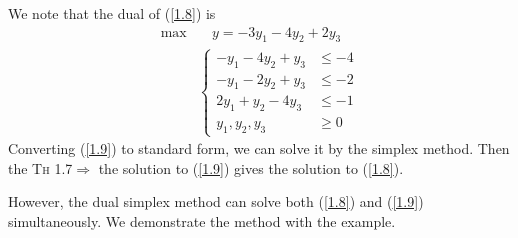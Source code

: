 \begin{example}
    We note that the dual of (\ref{1.8}) is
    \begin{align}
        \max & \quad y = -3y_1 - 4y_2 + 2y_3 \nonumber\\
        & \left\lbrace\begin{array}{ll}
            -y_1-4y_2+y_3 &\le  -4\\
            -y_1-2y_2+y_3 &\le -2\\
            2y_1+y_2-4y_3 &\le -1\\
            y_1,y_2, y_3 &\ge 0
        \end{array} \right.\label{1.9}
    \end{align}
    Converting (\ref{1.9}) to standard form, we can solve it by the simplex method. Then the \textcolor{MarkerColour}{\textsc{Th 1.7}}$\Longrightarrow$ the solution to (\ref{1.9}) gives the solution to (\ref{1.8}).

    However, the dual simplex method can solve both (\ref{1.8}) and (\ref{1.9}) simultaneously. We demonstrate the method with the example. 
\end{example}

